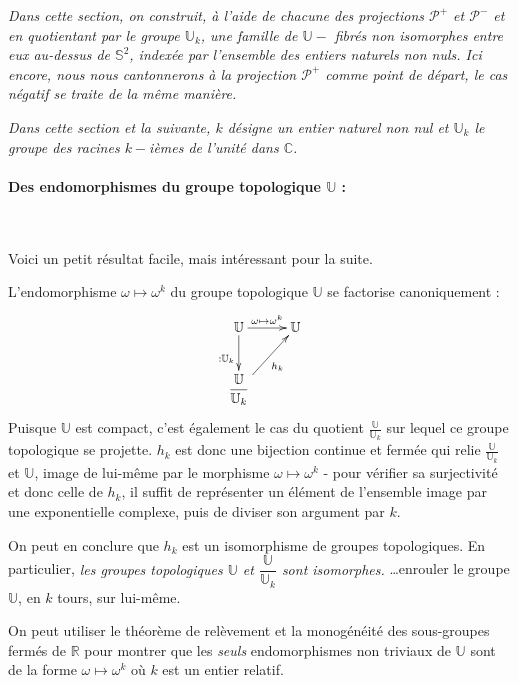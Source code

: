 \textit{%
Dans cette section, on construit, \`a l'aide de chacune des projections $\mathcal{P}^+$ et $\mathcal{P}^-$ et en quotientant par le groupe $\mathbb{U}_k$, %
une famille de $\mathbb{U}-$ fibr\'es non isomorphes entre eux au-dessus de $\mathbb{S}^2$, index\'ee par l'ensemble des entiers naturels non nuls. %
Ici encore, nous nous cantonnerons \`a la projection $\mathcal{P}^+$ comme point de d\'epart, le cas \og{}n\'egatif\fg{} se traite de la m\^eme mani\`ere.%
}

\emph{Dans cette section et la suivante, $k$ d\'esigne un entier naturel non nul et $\mathbb{U}_k$ le groupe des racines $k-$i\`emes de l'unit\'e dans $\mathbb{C}$.}

\paragraph{Des endomorphismes du groupe topologique $\mathbb{U}$ :}~\\
\par
Voici un petit r\'esultat facile, mais int\'eressant pour la suite.
\par
L'endomorphisme $\omega\mapsto\omega^k$ du groupe topologique $\mathbb{U}$ se factorise canoniquement :
\[\xymatrix{%
\mathbb{U} \ar[r]^{\omega\mapsto\omega^k} \ar[d]_{:\mathbb{U}_k}&\mathbb{U}\\%
\dfrac{\mathbb{U}}{\mathbb{U}_k} \ar[ru]_{h_k}&%
}\]%
Puisque $\mathbb{U}$ est compact, c'est \'egalement le cas du quotient $\frac{\mathbb{U}}{\mathbb{U}_k}$ sur lequel ce groupe topologique se projette. %
$h_k$ est donc une bijection continue et ferm\'ee qui relie $\frac{\mathbb{U}}{\mathbb{U}_k}$ et $\mathbb{U}$, %
image de lui-m\^eme par le morphisme $\omega\mapsto\omega^k$ - pour v\'erifier sa surjectivit\'e et donc celle de $h_k$, il suffit de repr\'esenter un \'el\'ement de l'ensemble image par une exponentielle complexe, %
puis de diviser son argument par $k$.
\par
On peut en conclure que $h_k$ est un isomorphisme de groupes topologiques. En particulier, %
\emph{%
les groupes topologiques $\mathbb{U}$ et $\dfrac{\mathbb{U}}{\mathbb{U}_k}$ sont isomorphes.%
}
\ligneinter
\dots enrouler le groupe $\mathbb{U}$, en $k$ tours, sur lui-m\^eme.

\begin{rema}
On peut utiliser le th\'eor\`eme de rel\`evement et la monog\'en\'eit\'e des sous-groupes ferm\'es de $\mathbb{R}$ pour montrer que les \emph{seuls} %
endomorphismes non triviaux de $\mathbb{U}$ sont de la forme $\omega\mapsto\omega^k$ o\`u $k$ est un entier relatif.
\end{rema}


